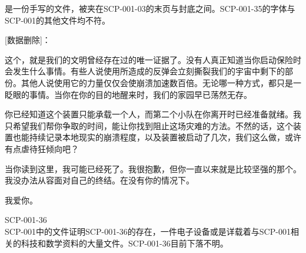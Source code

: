 是一份手写的文件，被夹在SCP-001-03的末页与封底之间。SCP-001-35的字体与SCP-001的其他文件均不符。

\begin{scpbox}

{[}数据删除]：

这个，就是我们的文明曾经存在过的唯一证据了。没有人真正知道当你启动保险时会发生什么事情。有些人说使用所造成的反弹会立刻撕裂我们的宇宙中剩下的部份。其他人说使用它的力量仅仅会使崩溃加速数百倍。无论哪一种方式，都只是一眨眼的事情。当你在你的目的地醒来时，我们的家园早已荡然无存。

你已经知道这个装置只能承载一个人，而第二个小队在你离开时已经准备就绪。我只希望我们帮你争取的时间，能让你找到阻止这场灾难的方法。不然的话，这个装置也能持续记录本地现实的崩溃程度，以及装置被启动了几次，我们这么做，或许有点虐待狂倾向吧？

当你读到这里，我可能已经死了。我很抱歉，但你一直以来就是比较坚强的那个。我没办法从容面对自己的终结。在没有你的情况下。

我爱你。

\end{scpbox}

SCP-001-36\\
SCP-001中的文件证明SCP-001-36的存在，一件电子设备或是详载着与SCP-001相关的科技和数学资料的大量文件。SCP-001-36目前下落不明。
